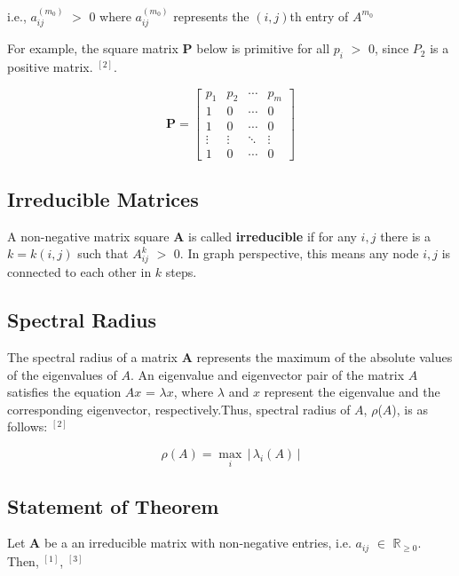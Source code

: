 \documentclass[11pt,a4,twocolumn]{article}
\newcommand{\hAbs}[1]{\ensuremath{\left \lvert \, #1 \, \right \rvert} } %
\theoremstyle{plain}
\theoremstyle{definition}
\theoremstyle{remark}
\begin{document}
i.e., $a^{(m_0)}_{ij}$ $>$ 0 where $a^{(m_0)}_{ij}$ represents the $(i, j)$th entry of $A^{m_0}$

For example, the square matrix  $\mathbf{P}$ below is primitive for all $p_{i}$ $>$ 0, since $P_2$ is a positive matrix. $^{[2]}$.

\[
\mathbf{P} =
\begin{bmatrix}
p_{1} &  p_{2}  & \cdots & p_{m}\\
1 & 0 & \cdots & 0 \\
1 & 0 & \cdots & 0 \\
\vdots & \vdots & \ddots & \vdots\\
1 & 0 & \cdots & 0
\end{bmatrix}
\] 

\subsection{Irreducible Matrices}

A non-negative matrix square $\mathbf{A}$ is called \textbf{irreducible} if for any $i, j$ there is a
$k = k(i, j)$ such that $A^k_{ij}$ $>$ 0. In graph perspective, this means any node  $i, j$ is connected to each other in $k$ steps.


\subsection{Spectral Radius}

The spectral radius of a matrix  $\mathbf{A}$ represents the maximum of the absolute values of the eigenvalues of $A$. An
eigenvalue and eigenvector pair of the matrix $A$ satisfies the equation $A$\underline{$x$} = $\lambda$\underline{$x$}, where $\lambda$ and \underline{$x$} represent the eigenvalue and the corresponding eigenvector, respectively.Thus, spectral radius of $A$, $\rho$($A$), is as follows: $^{[2]}$

\[
\rho(A) = \underset{i}{ \max} \, \hAbs{\lambda_i(A)}
\] 


\subsection{Statement of Theorem}

Let  $\mathbf{A}$ be a an irreducible matrix with non-negative entries, i.e.  $a_{ij}$ $\in$ $\mathbb{R}_{\geq 0}$. Then, $^{[1]}$, $^{[3]}$
\end{document}
